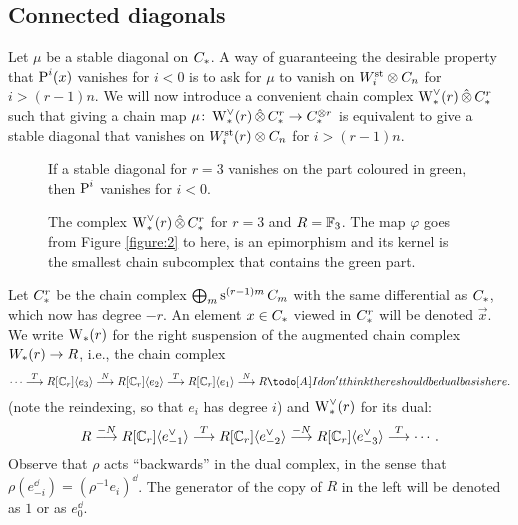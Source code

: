 \subsection{Connected diagonals}\label{s:connected}

Let $\mu$ be a stable diagonal on $\ucadenas$.
A way of guaranteeing the desirable property that $\power^i(x)$ vanishes for $i<0$ is to ask for $\mu$ to vanish on $\Wst[i] \ot \ucadenas[n]$ for $i>(r-1)n$.
We will now introduce a convenient chain complex $\rWd(r) \hotimes \rucadenas$ such that giving a chain map $\mu \colon \rWd(r)  \hotimes \rucadenas \to \ucadenas^{\ot r}$ is equivalent to give a stable diagonal that vanishes on $\Wst[i](r) \ot \ucadenas[n]$ for $i>(r-1)n$.

\begin{figure}
	
	\caption{If a stable diagonal for $r=3$ vanishes on the part coloured in green, then $\power^i$ vanishes for $i<0$.}
	\label{figure:2}

	
	\caption{The complex $\rWd(r) \hotimes \rucadenas$ for $r=3$ and $R=\bF_3$.
		The map $\varphi$ goes from Figure \ref{figure:2} to here, is an epimorphism and its kernel is the smallest chain subcomplex that contains the green part.}
	\label{figure:3}
\end{figure}

Let $\rucadenas$ be the chain complex $\bigoplus_m \sus{(r-1)m}\ucadenas[m]$ with the same differential as $\ucadenas$, which now has degree $-r$.
An element $x\in \ucadenas$ viewed in $\rucadenas$ will be denoted $\vec{x}$.
We write $\rW(r)$ for the right suspension of the augmented chain complex $\W(r) \to R$, i.e., the chain complex
\[
\dotsb
\overset{T}{\lra}
R[\Cyc_r]\langle e_{3}\rangle
\overset{N}{\lra}
R[\Cyc_r]\langle e_{2}\rangle
\overset{T}{\lra}
R[\Cyc_r]\langle e_{1}\rangle
\overset{N}{\lra}
R\anibal{I don't think there should be dual basis here.}
\]
(note the reindexing, so that $e_i$ has degree $i$) and $\rWd(r)$ for its dual:
\[
R\overset{-N}{\lra} R[\Cyc_r]\langle e_{-1}^\dd\rangle \overset{T}{\lra} R[\Cyc_r]\langle e_{-2}^\dd\rangle \overset{-N}{\lra} R[\Cyc_r]\langle e_{-3}^\dd\rangle \overset{T}{\lra} \dotsb.
\]
Observe that $\rho$ acts ``backwards'' in the dual complex, in the sense that $\rho (e_{-i}^\dd) = (\rho^{-1} e_i)^{\dd}$.
The generator of the copy of $R$ in the left will be denoted as $1$ or as $e_0^\dd$.

